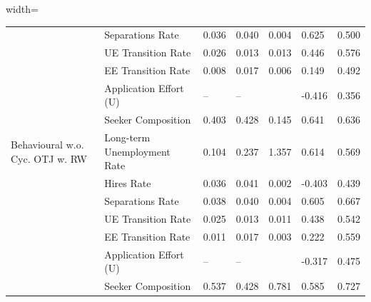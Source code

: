 \begin{adjustbox}{width=\textwidth}
\begin{tabular}{lllllll}
\cellcolor{modelBehaviouralwCycOTJwRW!25} & Separations Rate & 0.036 & 0.040 & 0.004 & \cellcolor{green!40!yellow!25}0.625 & 0.500 \\
\cellcolor{modelBehaviouralwCycOTJwRW!25} & UE Transition Rate & 0.026 & 0.013 & 0.013 & \cellcolor{green!70!yellow!25}0.446 & 0.576 \\
\cellcolor{modelBehaviouralwCycOTJwRW!25} & EE Transition Rate & 0.008 & 0.017 & 0.006 & \cellcolor{green!40!yellow!25}0.149 & 0.492 \\
\cellcolor{modelBehaviouralwCycOTJwRW!25} & Application Effort (U) & -- & -- &  & \cellcolor{red!25}-0.416 & 0.356 \\
\cellcolor{modelBehaviouralwCycOTJwRW!25} & Seeker Composition & 0.403 & 0.428 & 0.145 & \cellcolor{green!25}0.641 & 0.636 \\
\cellcolor{modelBehaviouralwoCycOTJwRW!25}Behavioural w.o. Cyc. OTJ w. RW & Long-term Unemployment Rate & 0.104 & 0.237 & 1.357 & \cellcolor{green!25}0.614 & 0.569 \\
\cellcolor{modelBehaviouralwoCycOTJwRW!25} & Hires Rate & 0.036 & 0.041 & 0.002 & \cellcolor{red!25}-0.403 & 0.439 \\
\cellcolor{modelBehaviouralwoCycOTJwRW!25} & Separations Rate & 0.038 & 0.040 & 0.004 & \cellcolor{yellow!25}0.605 & 0.667 \\
\cellcolor{modelBehaviouralwoCycOTJwRW!25} & UE Transition Rate & 0.025 & 0.013 & 0.011 & \cellcolor{green!40!yellow!25}0.438 & 0.542 \\
\cellcolor{modelBehaviouralwoCycOTJwRW!25} & EE Transition Rate & 0.011 & 0.017 & 0.003 & \cellcolor{green!70!yellow!25}0.222 & 0.559 \\
\cellcolor{modelBehaviouralwoCycOTJwRW!25} & Application Effort (U) & -- & -- &  & \cellcolor{orange!25}-0.317 & 0.475 \\
\cellcolor{modelBehaviouralwoCycOTJwRW!25} & Seeker Composition & 0.537 & 0.428 & 0.781 & \cellcolor{green!40!yellow!25}0.585 & 0.727 \\
\bottomrule
\end{tabular}
\end{adjustbox}
